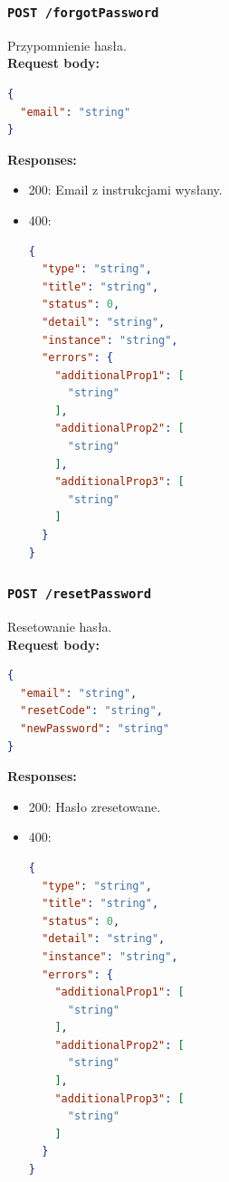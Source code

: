 \subsubsection{\lstinline[language=http]{POST /forgotPassword}}
Przypomnienie hasła. \\
\textbf{Request body:}
\begin{lstlisting}[language=json]
{
  "email": "string"
}
\end{lstlisting}
\textbf{Responses:}
\begin{itemize}
    \item 200: Email z instrukcjami wysłany.
    \item 400:
\begin{lstlisting}[language=json]
{
  "type": "string",
  "title": "string",
  "status": 0,
  "detail": "string",
  "instance": "string",
  "errors": {
    "additionalProp1": [
      "string"
    ],
    "additionalProp2": [
      "string"
    ],
    "additionalProp3": [
      "string"
    ]
  }
}
\end{lstlisting}
\end{itemize}

\subsubsection{\lstinline[language=http]{POST /resetPassword}}
Resetowanie hasła. \\
\textbf{Request body:}
\begin{lstlisting}[language=json]
{
  "email": "string",
  "resetCode": "string",
  "newPassword": "string"
}
\end{lstlisting}
\textbf{Responses:}
\begin{itemize}
    \item 200: Hasło zresetowane.
    \item 400:
\begin{lstlisting}[language=json]
{
  "type": "string",
  "title": "string",
  "status": 0,
  "detail": "string",
  "instance": "string",
  "errors": {
    "additionalProp1": [
      "string"
    ],
    "additionalProp2": [
      "string"
    ],
    "additionalProp3": [
      "string"
    ]
  }
}
\end{lstlisting}
\end{itemize}

